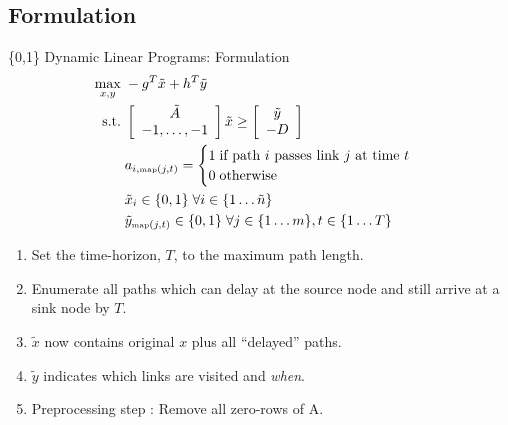 \documentclass[xcolor=pdflatex,dvipsnames,table]{beamer}
\begin{document}
\subsection{Formulation}
\begin{frame}{\{0,1\} Dynamic Linear Programs: Formulation}
\begin{align*}
\max_{x,y}\;& -g^T \tilde{x} + h^T \tilde{y} \\
\mbox{s.t.}\;& \left[ \begin{array}{c}
                       \tilde{A}\\
                       -1, \dots, -1
                      \end{array}\right] \tilde{x} \geq \left[ \begin{array}{c} \tilde{y}\\-D \end{array}\right] \\
&a_{i,\mbox{\tiny map}(j,t)} = \begin{cases}
           1\;\mbox{if path $i$ passes link $j$ at time $t$}\\
           0\;\mbox{otherwise}
          \end{cases}\\
&\tilde{x}_i \in \{0,1\}\;\forall i\in\{1\dots \tilde{n}\}\\
&\tilde{y}_{\mbox{\tiny map}(j,t)} \in \{0,1\}\;\forall j\in\{1\dots m\},t\in\{1\dots T\}
\end{align*}

\begin{enumerate}
\small
\item Set the time-horizon, $T$, to the maximum path length.
\item Enumerate all paths which can delay at the source node and still arrive at a sink node by $T$. 
\item $\tilde{x}$ now contains original $x$ plus all ``delayed'' paths.
\item $\tilde{y}$ indicates which links are visited and \emph{when}.
\item Preprocessing step : Remove all zero-rows of A.
\end{enumerate}
\end{frame}

\end{document}
